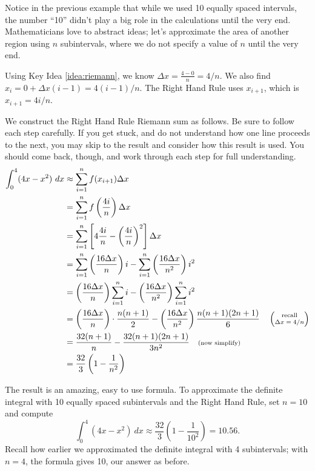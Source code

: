 Notice in the previous example that while we used 10 equally spaced intervals, the number ``10'' didn't play a big role in the calculations until the very end. Mathematicians love to abstract ideas; let's approximate the area of another region using $n$ subintervals, where we do not specify a value of $n$ until the very end.\\

{Using Key Idea \ref{idea:riemann}, we know $\Delta x = \frac{4-0}{n} = 4/n$. We also find $x_i = 0 + \Delta x(i-1) = 4(i-1)/n$. The Right Hand Rule uses $x_{i+1}$, which is $x_{i+1} = 4i/n$.

We construct the Right Hand Rule Riemann sum as follows. Be sure to follow each step carefully. If you get stuck, and do not understand how one line proceeds to the next, you may skip to the result and consider how this result is used. You should come back, though, and work through each step for full understanding.
\begin{align*}
		\int_0^4(4x-x^2)\ dx &\approx \sum_{i=1}^n f(x_{i+1})\Delta x \\
											&= \sum_{i=1}^n f\left(\frac{4i}{n}\right) \Delta x \\
											&=	\sum_{i=1}^n \left[4\frac{4i}n-\left(\frac{4i}n\right)^2\right]\Delta x\\
											&=	\sum_{i=1}^n \left(\frac{16\Delta x}{n}\right)i - \sum_{i=1}^n \left(\frac{16\Delta x}{n^2}\right)i^2 \\
											&=	\left(\frac{16\Delta x}{n}\right)\sum_{i=1}^n i - \left(\frac{16\Delta x}{n^2}\right)\sum_{i=1}^n i^2  \\
											&= \left(\frac{16\Delta x}{n}\right)\cdot \frac{n(n+1)}{2} - \left(\frac{16\Delta x}{n^2}\right)\frac{n(n+1)(2n+1)}{6} \quad \left(\parbox{35pt}{\scriptsize \centering recall $\Delta x = 4/n$}\right)\\
											&=\frac{32(n+1)}{n} - \frac{32(n+1)(2n+1)}{3n^2} \quad \text{\scriptsize (now simplify)} \\
											&= \frac{32}{3}\left(1-\frac{1}{n^2}\right)
\end{align*}

The result is an amazing, easy to use formula. To approximate the definite integral with 10 equally spaced subintervals and the Right Hand Rule, set $n=10$ and compute $$\int_0^4 (4x-x^2)\ dx \approx \frac{32}{3}\left(1-\frac{1}{10^2}\right) = 10.56.$$
Recall how earlier we approximated the definite integral with 4 subintervals; with $n=4$, the formula gives 10, our answer as before.

}
